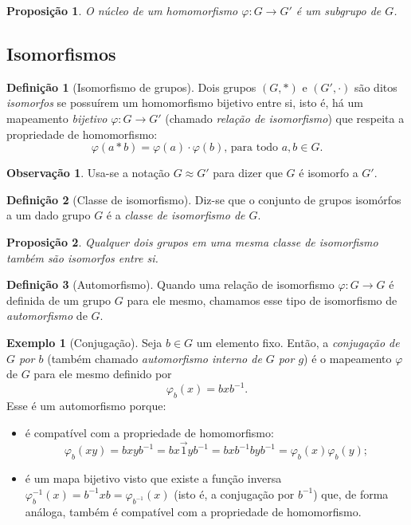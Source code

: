 \documentclass[a4paper,12pt]{report}
\theoremstyle{plain}
\newtheorem{proposicao}{Proposição}[section]
\theoremstyle{definition}
\newtheorem{definicao}{Definição}[section]
\newtheorem{observacao}{Observação}[section]
\newtheorem{exemplo}{Exemplo}[section]
\begin{document}
\begin{proposicao}
	O núcleo de um homomorfismo $\varphi: G \longrightarrow G'$ é um subgrupo de $G$.
\end{proposicao}

\subsection{Isomorfismos}

\begin{definicao}[Isomorfismo de grupos]
	Dois grupos \((G,*)\) e \((G',\cdot)\) são ditos \emph{isomorfos} se possuírem um homomorfismo bijetivo entre si, isto é, há um mapeamento \emph{bijetivo} $\varphi: G \longrightarrow G'$ (chamado \emph{relação de isomorfismo}) que respeita a propriedade de homomorfismo:
	\[\varphi(a*b) = \varphi(a)\cdot\varphi(b) \text{, para todo } a,b \in G.\] 
\end{definicao}

\begin{observacao}
	Usa-se a notação $G \approx G'$ para dizer que $G$ é isomorfo a $G'$.  
\end{observacao}

\begin{definicao}[Classe de isomorfismo]
	Diz-se que o conjunto de grupos isomórfos a um dado grupo \(G\) é a \emph{classe de isomorfismo de \(G\)}.	
\end{definicao}

\begin{proposicao}
	Qualquer dois grupos em uma mesma classe de isomorfismo também são isomorfos entre si.
\end{proposicao}

\begin{definicao}[Automorfismo]
	Quando uma relação de isomorfismo \(\varphi: G\longrightarrow G\) é definida de um grupo \(G\) para ele mesmo,	chamamos esse tipo de isomorfismo de \emph{automorfismo} de \(G\).
\end{definicao}

\begin{exemplo}[Conjugação]
	 Seja \(b\in G\) um elemento fixo. Então, a
	\emph{conjugação de \(G\) por \(b\)} (também chamado \emph{automorfismo interno de $G$ por $g$}) é o mapeamento \(\varphi\) de \(G\)
	para ele mesmo definido por
	\[\varphi_b(x) = bxb^{-1}.\]
	Esse é um automorfismo porque:
	\begin{itemize}
		\item é compatível com a propriedade de homomorfismo: \[\varphi_b(xy) = bxyb^{-1} = bx\vec{1}yb^{-1} = bxb^{-1}byb^{-1} = \varphi_b(x)\varphi_b(y);\]
		\item é um mapa bijetivo visto que existe a função inversa $\varphi_b^{-1}(x) = b^{-1}xb = \varphi_{b^{-1}}(x)$ (isto é, a conjugação por \(b^{-1}\)) que, de forma análoga, também é compatível com a propriedade de homomorfismo.
	\end{itemize}
\end{exemplo}
\end{document}
